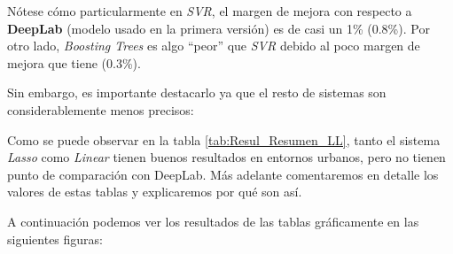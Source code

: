 Nótese cómo particularmente en \textit{\ac{SVR}}, el margen de mejora con respecto a \textbf{DeepLab} (modelo usado en la primera versión) es de casi un 1\% (0.8\%). Por otro lado, \textit{Boosting Trees} es algo ``peor'' que \textit{\ac{SVR}} debido al poco margen de mejora que tiene (0.3\%).

Sin embargo, es importante destacarlo ya que el resto de sistemas son considerablemente menos precisos:

\begin{table}[H]
\centering
{}
\caption{Resultados de Lasso y Linear}
\label{tab:Resul_Resumen_LL}
\end{table}

Como se puede observar en la tabla \ref{tab:Resul_Resumen_LL}, tanto el sistema \textit{Lasso} como \textit{Linear} tienen buenos resultados en entornos urbanos, pero no tienen punto de comparación con DeepLab. Más adelante comentaremos en detalle los valores de estas tablas y explicaremos por qué son así.

A continuación podemos ver los resultados de las tablas gráficamente en las siguientes figuras:

